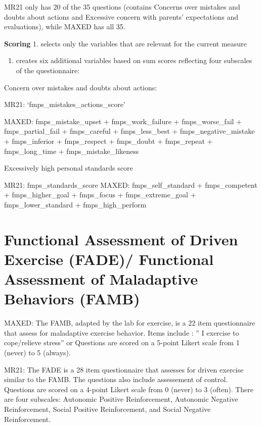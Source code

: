 \documentclass[
]{book}
\providecommand{\tightlist}{%
  \setlength{\itemsep}{0pt}\setlength{\parskip}{0pt}}
\begin{document}
MR21 only has 20 of the 35 questions (contains Concerns over mistakes
and doubts about actions and Excessive concern with parents'
expectations and evaluations), while MAXED has all 35.

\textbf{Scoring} 1. selects only the variables that are relevant for the
current measure

\begin{enumerate}
\def\labelenumi{\arabic{enumi}.}
\setcounter{enumi}{1}
\tightlist
\item
  creates six additional variables based on sum scores reflecting four
  subscales of the questionnaire:
\end{enumerate}

Concern over mistakes and doubts about actions:

MR21: `fmps\_mistakes\_actions\_score'

MAXED: fmps\_mistake\_upset + fmps\_work\_failure + fmps\_worse\_fail +
fmps\_partial\_fail + fmps\_careful + fmps\_less\_best +
fmps\_negative\_mistake + fmps\_inferior + fmps\_respect + fmps\_doubt +
fmps\_repeat + fmps\_long\_time + fmps\_mistake\_likeness

Excessively high personal standards score

MR21: fmps\_standards\_score MAXED: fmps\_self\_standard + fmps\_competent +
fmps\_higher\_goal + fmps\_focus + fmps\_extreme\_goal +
fmps\_lower\_standard + fmps\_high\_perform

\section{Functional Assessment of Driven Exercise (FADE)/ Functional Assessment of Maladaptive Behaviors (FAMB)}\label{functional-assessment-of-driven-exercise-fade-functional-assessment-of-maladaptive-behaviors-famb}

MAXED: The FAMB, adapted by the lab for exercise, is a 22 item
questionnaire that assess for maladaptive exercise behavior. Items
include : '' I exercise to cope/relieve stress'' or Questions are scored
on a 5-point Likert scale from 1 (never) to 5 (always).

MR21: The FADE is a 28 item questionnaire that assesses for driven
exercise similar to the FAMB. The questions also include assessement of
control. Questions are scored on a 4-point Likert scale from 0 (never)
to 3 (often). There are four subscales: Autonomic Positive
Reinforcement, Autonomic Negative Reinforcement, Social Positive
Reinforcement, and Social Negative Reinforcement.
\end{document}
